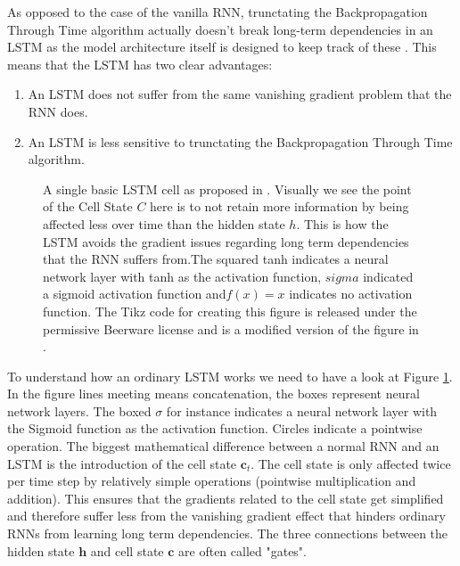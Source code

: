 As opposed to the case of the vanilla RNN, trunctating the Backpropagation Through 
Time algorithm actually doesn't break long-term dependencies in an LSTM as the 
model architecture itself is designed to keep track of these \citep{graves2012long}.
This means that the LSTM has two clear advantages:
\begin{enumerate}
	\item An LSTM does not suffer from the same vanishing gradient problem that the RNN does.
	\item An LSTM is less sensitive to trunctating the Backpropagation Through Time algorithm.
\end{enumerate}

\begin{figure}
\centering
    
    \caption[An LSTM cell.]{A single basic LSTM cell as proposed in \citet{hochreiter1997long}. Visually we see the point of the Cell State $C$ here is to not retain more information 
by being affected less over time than the hidden state $h$. This is how the LSTM 
avoids the gradient issues regarding long term dependencies that the RNN suffers 
from.The squared tanh indicates a neural 
    network layer with tanh as the activation function, $sigma$ indicated a sigmoid 
	activation function and$f(x)=x$ indicates no activation function.
The Tikz code for creating this figure is released under the permissive Beerware license 
and is a modified version of the figure in \citet{tikzlstm}.
}
\label{LSTM figure}
\end{figure}
To understand how an ordinary LSTM works we need to have a look at Figure \ref{LSTM figure}.
In the figure lines meeting means concatenation, the boxes represent neural network layers. The boxed $\sigma$ for instance indicates a neural network layer with the Sigmoid function 
as the activation function. Circles indicate a pointwise operation.
The biggest mathematical difference between a normal RNN and an LSTM is the introduction 
of the cell state $\bm{c}_t$. The cell state is only affected twice per time step 
by relatively simple operations (pointwise multiplication and addition). This 
ensures that the gradients related to the cell state get simplified and therefore 
suffer less from the vanishing gradient effect that hinders ordinary RNNs from 
learning long term dependencies. The three connections between the hidden state 
$\bm{h}$ and cell state $\bm{c}$ are often called "gates".
